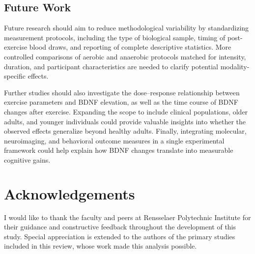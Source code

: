 \documentclass[runningheads]{llncs}
\begin{document}
\subsection{Future Work}

Future research should aim to reduce methodological variability by standardizing measurement protocols, including the type of biological sample, timing of post-exercise blood draws, and reporting of complete descriptive statistics. More controlled comparisons of aerobic and anaerobic protocols matched for intensity, duration, and participant characteristics are needed to clarify potential modality-specific effects.

Further studies should also investigate the dose–response relationship between exercise parameters and BDNF elevation, as well as the time course of BDNF changes after exercise. Expanding the scope to include clinical populations, older adults, and younger individuals could provide valuable insights into whether the observed effects generalize beyond healthy adults. Finally, integrating molecular, neuroimaging, and behavioral outcome measures in a single experimental framework could help explain how BDNF changes translate into measurable cognitive gains.


\section*{Acknowledgements}

I would like to thank the faculty and peers at Rensselaer Polytechnic Institute for their guidance and constructive feedback throughout the development of this study. Special appreciation is extended to the authors of the primary studies included in this review, whose work made this analysis possible. 





\end{document}

